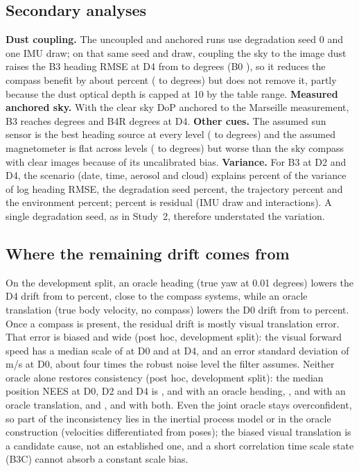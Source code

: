 \subsection{Secondary analyses}
\textbf{Dust coupling.} The uncoupled and anchored runs use degradation seed 0 and one IMU draw; on that same seed and draw, coupling the sky to the image dust raises the B3 heading RMSE at D4 from \sunBthreeDfourhd{} to \scpsBthreeDfourhd{} degrees (B0 \scpsBzeroDfourhd{}), so it reduces the compass benefit by about \sbenefitRed{} percent (\sbenefitUn{} to \sbenefitCo{} degrees) but does not remove it, partly because the dust optical depth is capped at 10 by the table range. \textbf{Measured anchored sky.} With the clear sky DoP anchored to the Marseille measurement, B3 reaches \saBthreeDfourhd{} degrees and B4R \saBfourRDfourhd{} degrees at D4. \textbf{Other cues.} The assumed sun sensor is the best heading source at every level (\scSUNDzerohd{} to \scSUNDfourhd{} degrees) and the assumed magnetometer is flat across levels (\scMAGDzerohd{} to \scMAGDfourhd{} degrees) but worse than the sky compass with clear images because of its uncalibrated bias. \textbf{Variance.} For B3 at D2 and D4, the scenario (date, time, aerosol and cloud) explains \svcscen{} percent of the variance of log heading RMSE, the degradation seed \svctseed{} percent, the trajectory \svctraj{} percent and the environment \svcenvironment{} percent; \svcresidual{} percent is residual (IMU draw and interactions). A single degradation seed, as in Study~2, therefore understated the variation.

\subsection{Where the remaining drift comes from}
On the development split, an oracle heading (true yaw at 0.01 degrees) lowers the D4 drift from \sdevBzeroDfourdr{} to \sdevORHDfourdr{} percent, close to the compass systems, while an oracle translation (true body velocity, no compass) lowers the D0 drift from \sdevBzeroDzerodr{} to \sdevORTDzerodr{} percent. Once a compass is present, the residual drift is mostly visual translation error. That error is biased and wide (post hoc, development split): the visual forward speed has a median scale of \svoScaleDzero{} at D0 and \svoScaleDfour{} at D4, and an error standard deviation of \svoSdDzero{} m/s at D0, about four times the robust noise level the filter assumes. Neither oracle alone restores consistency (post hoc, development split): the median position NEES at D0, D2 and D4 is \sorORHDzeronees{}, \sorORHDtwonees{} and \sorORHDfournees{} with an oracle heading, \sorORTDzeronees{}, \sorORTDtwonees{} and \sorORTDfournees{} with an oracle translation, and \sorORXDzeronees{}, \sorORXDtwonees{} and \sorORXDfournees{} with both. Even the joint oracle stays overconfident, so part of the inconsistency lies in the inertial process model or in the oracle construction (velocities differentiated from poses); the biased visual translation is a candidate cause, not an established one, and a short correlation time scale state (B3C) cannot absorb a constant scale bias.

